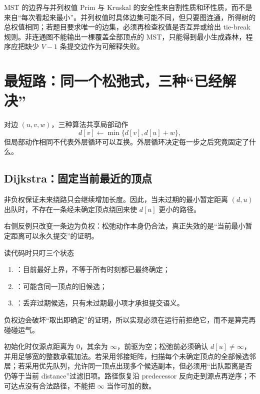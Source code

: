 \documentclass[UTF8,fontset=none,11pt,a4paper]{ctexart}
\begin{document}


\begin{methodbox}{MST 的边界与并列权值}
Prim 与 Kruskal 的安全性来自割性质和环性质，而不是来自“每次看起来最小”。并列权值时具体边集可能不同，但只要图连通，所得树的总权值相同；若题目要求唯一的边集，必须再检查权值是否互异或给出 tie-break 规则。非连通图不能输出一棵覆盖全部顶点的 MST，只能得到最小生成森林，程序应把缺少 $V-1$ 条提交边作为可解释失败。
\end{methodbox}

\section{最短路：同一个松弛式，三种“已经解决”}

对边 $(u,v,w)$，三种算法共享局部动作
\[
d[v]\leftarrow\min\{d[v],d[u]+w\},
\]
但局部动作相同不代表外层循环可以互换。外层循环决定每一步之后究竟固定了什么。

\subsection{Dijkstra：固定当前最近的顶点}
非负权保证未来绕路只会继续增加长度。因此，当未过期的最小暂定距离 $(d,u)$ 出队时，不存在一条经未确定顶点绕回来使 $d[u]$ 更小的路径。

\begin{center}
\resizebox{0.94\linewidth}{!}{}
\end{center}
右侧反例只改变一条边为负权：松弛动作本身仍合法，真正失效的是“当前最小暂定距离可以永久提交”的证明。

\begin{methodbox}{读代码时只盯三个状态}
\begin{enumerate}
  \item {}：目前最好上界，不等于所有时刻都已最终确定；
  \item {}：可能含同一顶点的旧候选；
  \item {}：丢弃过期候选，只有未过期最小项才承担提交语义。
\end{enumerate}
负权边会破坏“取出即确定”的证明，所以实现必须在运行前拒绝它，而不是算完再碰碰运气。

初始化时仅源点距离为 $0$，其余为 $\infty$，前驱为空；松弛前必须确认 $d[u]\ne\infty$，并用足够宽的整数承载加法。若采用邻接矩阵，扫描每个未确定顶点的全部候选邻居；若采用优先队列，允许同一顶点出现多个候选副本，但必须用“出队距离是否仍等于当前 distance”过滤旧项。路径恢复沿 predecessor 反向走到源点再逆序；不可达点没有合法路径，不能把 $\infty$ 当作可加的数。
\end{methodbox}
\end{document}
